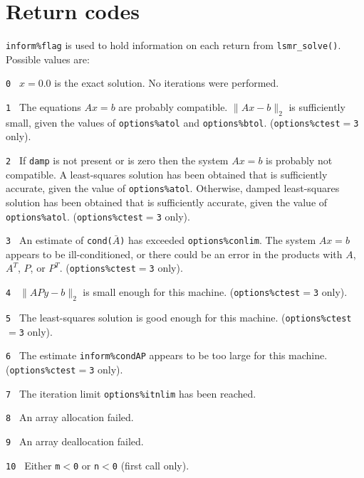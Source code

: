 
\section{Return codes} \label{LSMR:errors}

{\tt inform\%flag} is used to hold
   information on each return from {\tt lsmr\_solve()}. 
Possible values are:
\begin{description}
\item{\tt 0 }  $x = 0.0$  is the exact solution.
               No iterations were performed.
\item{\tt 1 }  The equations $Ax = b$ are probably compatible.
               $\|Ax - b\|_2$ is sufficiently small, given the
               values of {\tt options\%atol} and {\tt options\%btol}. 
               ({\tt options\%ctest}$ = ${\tt 3} only). 
\item{\tt 2 }  If {\tt damp} is not present or is zero then the system $Ax = b$
               is probably not compatible.  A least-squares solution has been
               obtained that is sufficiently accurate, given the value of
               {\tt options\%atol}.  
               Otherwise, damped least-squares solution has been obtained that
               is sufficiently accurate, given the value of {\tt options\%atol}.
               ({\tt options\%ctest}$ = ${\tt 3} only). 
\item{\tt 3 }  An estimate of {\tt cond($\bar{A}$)} has exceeded
               {\tt options\%conlim}. The system $Ax = b$ appears to be
               ill-conditioned, or there could be an error in the products 
               with $A$, $A^T$, $P$, or $P^T$. ({\tt options\%ctest}$ = ${\tt 3}
               only). 
\item{\tt 4 }  $\|APy - b \|_2$ is small enough for this machine.
               ({\tt options\%ctest}$ = ${\tt 3} only). 
\item{\tt 5 }  The least-squares solution is good enough for this
               machine. ({\tt options\%ctest}$ = ${\tt 3} only). 
\item{\tt 6 }  The estimate {\tt inform\%condAP} appears to be too large 
               for this machine.         
               ({\tt options\%ctest}$ = ${\tt 3} only). 
\item{\tt 7 }  The iteration limit {\tt options\%itnlim} has been reached. 
\item{\tt 8 }  An array allocation failed.
\item{\tt 9 }  An array deallocation failed.
\item{\tt 10 } Either  {\tt m$<$0} or {\tt n$<$0} (first call only).

\end{description}

